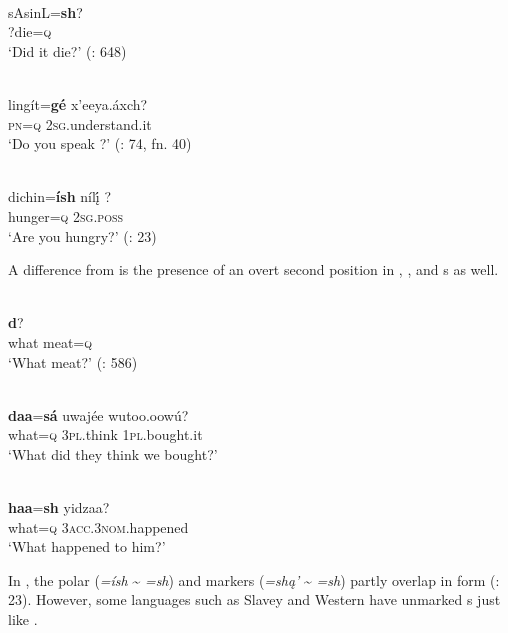 \ea%
    \label{ex:yeni:14}
    \\
    \gll sAsinL=\textbf{{sh}}?\\
    ?die=\textsc{q}\\
    \glt ‘Did it die?’ (\citealt{Kraussforthcoming}: 648)
    \z

\ea%
    \label{ex:yeni:15}
    \\
    \gll lingít{=}\textbf{{gé}} x’eeya.áxch?\\
    \textsc{pn=q}    2\textsc{sg}.understand.it\\
    \glt ‘Do you speak ?’ (\citealt{Cable2007}: 74, fn. 40)
    \z

\ea%
    \label{ex:yeni:16}
    \\
    \gll dichin=\textbf{{ísh}} níl\k{í}  ?\\
    hunger=\textsc{q}  2\textsc{sg}.\textsc{poss}\\
    \glt ‘Are you hungry?’ (\citealt{Young1987}: 23)
    \z

A difference from  is the presence of an overt second position  in , , and  s as well.

\ea%
    \label{ex:yeni:17}
    \\
    \textbf{{d}}?\\
    what  meat=\textsc{q}\\
    \glt ‘What meat?’ (\citealt{Kraussforthcoming}: 586)
    \z

\ea%
    \label{ex:yeni:18}
    \\
    \gll \textbf{{d}}\textbf{{aa}}{=}\textbf{{sá}} uwajée wutoo.oowú?\\
    what=\textsc{q}    3\textsc{pl}.think  1\textsc{pl}.bought.it\\
    \glt ‘What did they think we bought?’ \citep[69]{Cable2007}
    \z

\ea%
    \label{ex:yeni:19}
    \\
    \gll \textbf{{haa}}{=}\textbf{{sh}} yidzaa?\\
    what=\textsc{q}  3\textsc{acc}.3\textsc{nom}.happened\\
    \glt ‘What happened to him?’ \citep[33]{Fountain2008}
    \z

\noindent In , the polar (\textit{=ísh} {\textasciitilde} \textit{=sh}) and  markers (\textit{=shą’} {\textasciitilde} \textit{=sh}) partly overlap in form (\citealt{Young1987}: 23). However, some languages such as Slavey and Western  have unmarked s just like .

